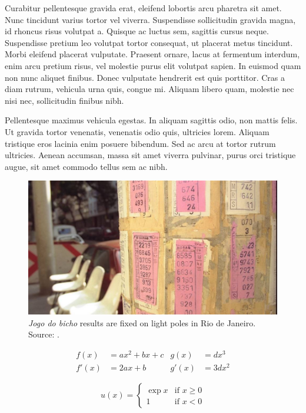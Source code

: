 Curabitur pellentesque gravida erat, eleifend lobortis arcu pharetra sit amet. Nunc tincidunt varius tortor vel viverra. Suspendisse sollicitudin gravida magna, id rhoncus risus volutpat a. Quisque ac luctus sem, sagittis cursus neque. Suspendisse pretium leo volutpat tortor consequat, ut placerat metus tincidunt. Morbi eleifend placerat vulputate. Praesent ornare, lacus at fermentum interdum, enim arcu pretium risus, vel molestie purus elit volutpat sapien. In euismod quam non nunc aliquet finibus. Donec vulputate hendrerit est quis porttitor. Cras a diam rutrum, vehicula urna quis, congue mi. Aliquam libero quam, molestie nec nisi nec, sollicitudin finibus nibh.

Pellentesque maximus vehicula egestas. In aliquam sagittis odio, non mattis felis. Ut gravida tortor venenatis, venenatis odio quis, ultricies lorem. Aliquam tristique eros lacinia enim posuere bibendum. Sed ac arcu at tortor rutrum ultricies. Aenean accumsan, massa sit amet viverra pulvinar, purus orci tristique augue, sit amet commodo tellus sem ac nibh. 

\begin{figure}[!htbp]
 \centering
 \includegraphics[width=\textwidth, height=6cm]{images/bicho05.jpg}
 \caption{\emph{Jogo do bicho} results are fixed on light poles in Rio de Janeiro. Source: \citet{gomes1998bicho}.}
 \label{fig:poste}
\end{figure}

\begin{align}
 f(x)  &= a x^2+b x +c   &   g(x)  &= d x^3 \\
 f'(x) &= 2 a x +b       &   g'(x) &= 3 d x^2
\end{align}


\begin{equation}
  u(x) = 
  \begin{cases} 
   \exp{x} & \text{if } x \geq 0 \\
   1       & \text{if } x < 0
  \end{cases}
\end{equation}

